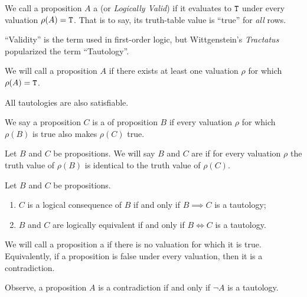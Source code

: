 \begin{node}[Semantics]
\begin{definition}\label{prop-000L}%
We call a proposition $A$ a  (or \textit{Logically Valid})
if it evaluates to $\mathtt{T}$ under every valuation $\rho(A)=\mathtt{T}$.
That is to say, its truth-table value is ``true'' for \emph{all} rows.

``Validity'' is the term used in first-order logic, but Wittgenstein's
\textit{Tractatus} popularized the term ``Tautology''.
\end{definition}

\begin{definition}\label{prop-000M}%
We will call a proposition $A$  if there exists at
least one valuation $\rho$ for which $\rho(A)=\mathtt{T}$. 

\begin{node}\label{prop-000N}%
All tautologies are also satisfiable.
\end{node}
\end{definition}

\begin{definition}\label{prop-0005}%
We say a proposition $C$ is a  of
proposition $B$ if every valuation $\rho$ for which $\rho(B)$ is true
also makes $\rho(C)$ true.
\end{definition}

\begin{definition}\label{prop-0006}%
Let $B$ and $C$ be propositions. We will say $B$ and $C$ are
 if for every valuation $\rho$ the
truth value of $\rho(B)$ is identical to the truth value of $\rho(C)$.
\end{definition}

\begin{node}\label{prop-0007}%
Let $B$ and $C$ be propositions.
\begin{enumerate}
\item $C$ is a logical consequence of $B$ if and only if $B\implies C$
  is a tautology;
\item $B$ and $C$ are logically equivalent if and only if $B\iff C$ is a tautology.
\end{enumerate}
\end{node}

\begin{definition}\label{prop-0008}%
We will call a proposition a  if there is no
valuation for which it is true. Equivalently, if a proposition is
false under every valuation, then it is a contradiction.
\begin{node}\label{prop-0009}%
Observe, a proposition $A$ is a contradiction if and only if $\neg A$
is a tautology.
\end{node}
\end{definition}


\end{node}

